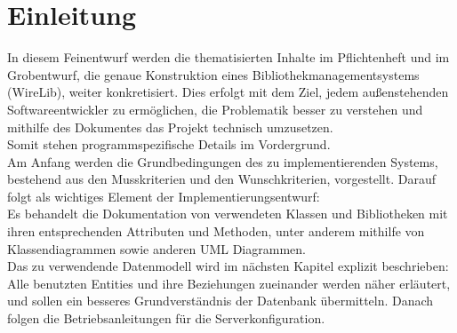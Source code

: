 \chapter{Einleitung}

In diesem Feinentwurf werden die thematisierten Inhalte im Pflichtenheft und im Grobentwurf, die genaue Konstruktion eines Bibliothekmanagementsystems (WireLib), weiter konkretisiert. 
Dies erfolgt mit dem Ziel, jedem außenstehenden Softwareentwickler zu ermöglichen, die Problematik besser zu verstehen und mithilfe des Dokumentes das Projekt technisch umzusetzen.\\
Somit stehen programmspezifische Details im Vordergrund. \\
Am Anfang werden die Grundbedingungen des zu implementierenden Systems, bestehend aus den Musskriterien und den Wunschkriterien, vorgestellt.
Darauf folgt als wichtiges Element der Implementierungsentwurf: \\
Es behandelt die Dokumentation von verwendeten Klassen und Bibliotheken mit ihren entsprechenden Attributen und Methoden, unter anderem mithilfe von Klassendiagrammen sowie anderen UML Diagrammen.\\ 
Das zu verwendende Datenmodell wird im nächsten Kapitel explizit beschrieben: \\
Alle benutzten Entities und ihre Beziehungen zueinander werden näher erläutert, und sollen ein besseres Grundverständnis der Datenbank übermitteln.
Danach folgen die Betriebsanleitungen für die Serverkonfiguration.    
